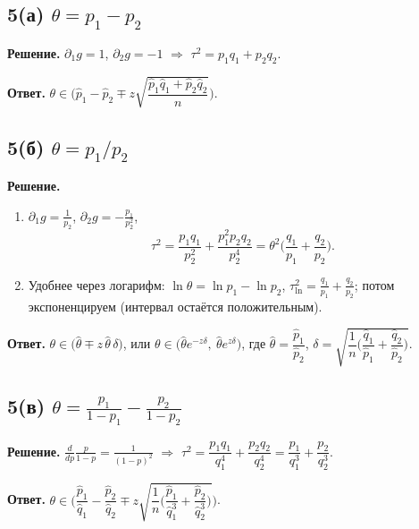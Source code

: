 \documentclass[12pt,a4paper]{article}
\newcommand{\sol}{\par\noindent\textbf{Решение.} }
\newcommand{\ans}{\par\smallskip\noindent\textbf{Ответ.} }
\begin{document}
\subsection*{5(а) \quad $\theta=p_1-p_2$}
\sol $\partial_1g=1$, $\partial_2g=-1$ $\Rightarrow$ $\tau^2=p_1q_1+p_2q_2$.
\ans $\theta\in\Big(\hat p_1-\hat p_2\mp z\sqrt{\dfrac{\hat p_1\hat q_1+\hat p_2\hat q_2}{n}}\Big)$.

\subsection*{5(б) \quad $\theta=p_1/p_2$}
\sol
\begin{enumerate}
  \item $\partial_1g=\frac1{p_2}$, $\partial_2g=-\frac{p_1}{p_2^2}$,
  \[
    \tau^2=\frac{p_1q_1}{p_2^2}+\frac{p_1^2p_2q_2}{p_2^4}
    =\theta^2\Big(\frac{q_1}{p_1}+\frac{q_2}{p_2}\Big).
  \]
  \item Удобнее через логарифм: $\ln\theta=\ln p_1-\ln p_2$,
        $\tau^2_{\ln}=\frac{q_1}{p_1}+\frac{q_2}{p_2}$; потом
        экспоненцируем (интервал остаётся положительным).
\end{enumerate}
\ans $\theta\in\Big(\hat\theta\mp z\,\hat\theta\,\delta\Big)$, или
     $\theta\in\big(\hat\theta e^{-z\delta},\ \hat\theta e^{z\delta}\big)$,
     где $\hat\theta=\dfrac{\hat p_1}{\hat p_2}$,
     $\delta=\sqrt{\dfrac1n\Big(\dfrac{\hat q_1}{\hat p_1}+\dfrac{\hat q_2}{\hat p_2}\Big)}$.

\subsection*{5(в) \quad $\theta=\frac{p_1}{1-p_1}-\frac{p_2}{1-p_2}$}
\sol $\frac{d}{dp}\frac p{1-p}=\frac1{(1-p)^2}$ $\Rightarrow$
     $\tau^2=\dfrac{p_1q_1}{q_1^4}+\dfrac{p_2q_2}{q_2^4}
     =\dfrac{p_1}{q_1^3}+\dfrac{p_2}{q_2^3}$.
\ans $\theta\in\Big(\dfrac{\hat p_1}{\hat q_1}-\dfrac{\hat p_2}{\hat q_2}
     \mp z\sqrt{\dfrac1n\Big(\dfrac{\hat p_1}{\hat q_1^3}+\dfrac{\hat p_2}{\hat q_2^3}\Big)}\Big)$.

\end{document}
